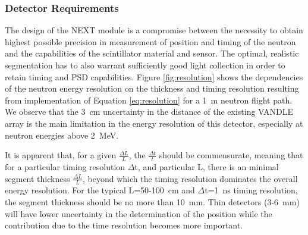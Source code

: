 \documentclass[preprint,3p,twocolumn]{elsarticle}
\begin{document}
\subsubsection{Detector Requirements}

The design of the NEXT module is a compromise between the necessity to obtain highest possible precision in measurement of position and timing of the neutron and the capabilities of the scintillator material and sensor. The optimal, realistic segmentation has to also warrant sufficiently good light collection in order to retain timing and PSD capabilities. Figure \ref{fig:resolution} shows the dependencies of the  neutron energy resolution on the thickness and timing resolution resulting from implementation of Equation \ref{eq:resolution} for a 1~m neutron flight path. We observe that the 3~cm uncertainty in the distance of the existing VANDLE \cite{PETERS2016122} array is the main limitation in the energy resolution of this detector, especially at neutron energies above 2~MeV.

It is apparent that, for a given $\frac{\Delta L}{L}$, the $\frac{\Delta t}{t}$  should be commensurate, meaning that for a particular timing resolution $\Delta$t, and particular L, there is an minimal segment thickness $\frac{\Delta L}{L}$, beyond which the timing resolution dominates the overall energy resolution. For the typical L=50-100~cm and $\Delta$t=1~ns  timing resolution, the segment thickness should be no more than 10~mm. Thin detectors (3-6~mm) will have lower uncertainty in the determination of the position while the contribution due to the time resolution becomes more important.
\end{document}
